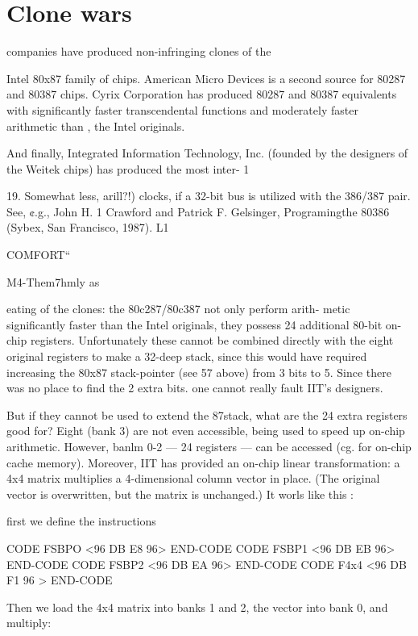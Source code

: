 {{{ 

\section{Clone wars}

 companies have produced non-infringing clones of the

Intel 80x87 family of chips. American Micro Devices is a second
source for 80287 and 80387 chips. Cyrix Corporation has
produced 80287 and 80387 equivalents with significantly faster
transcendental functions and moderately faster arithmetic than ,
the Intel originals.

And finally, Integrated Information Technology, Inc. (founded by
the designers of the Weitek chips) has produced the most inter- 1

 

19. Somewhat less, arill?!) clocks, if a 32-bit bus is utilized with the 386/387 pair. See, ¢.g., John H. 1
Crawford and Patrick F. Gelsinger, Programingthe 80386 (Sybex, San Francisco, 1987). L1

COMFORT“

M4-Them7hmly as

eating of the clones: the 80c287/80c387 not only perform arith-
metic significantly faster than the Intel originals, they possess 24
additional 80-bit on-chip registers. Unfortunately these cannot
be combined directly with the eight original registers to make a
32-deep stack, since this would have required increasing the
80x87 stack-pointer (see 57 above) from 3 bits to 5. Since there
was no place to find the 2 extra bits. one cannot really fault IIT's
designers.

But if they cannot be used to extend the 87stack, what are the 24
extra registers good for? Eight (bank 3) are not even accessible,
being used to speed up on-chip arithmetic. However, banlm 0-2
— 24 registers — can be accessed (cg. for on-chip cache memory).
Moreover, IIT has provided an on-chip linear transformation: a
4x4 matrix multiplies a 4-dimensional column vector in place. (The
original vector is overwritten, but the matrix is unchanged.) It worls
like this :

first we define the instructions

CODE FSBPO <96 DB E8 96> END-CODE
CODE FSBP1 <96 DB EB 96> END-CODE
CODE FSBP2 <96 DB EA 96> END-CODE
CODE F4x4 <96 DB F1 96 > END-CODE

Then we load the 4x4 matrix into banks 1 and 2, the vector into
bank 0, and multiply:

}}}
